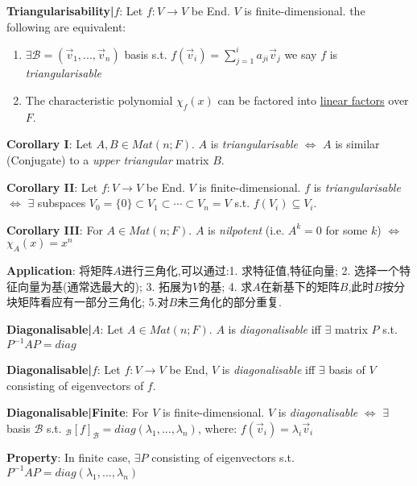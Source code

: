 \documentclass[9pt]{article}
\begin{document}
\textbf{Triangularisability|$f$}: Let $f:V\to V$ be End. $V$ is finite-dimensional. the following are equivalent:
\begin{enumerate}[itemsep=-2pt, topsep=-2pt]
    \item $\exists \mathcal{B}=(\vec{v}_1,...,\vec{v}_n)$ basis s.t. $f(\vec{v}_i)=\sum_{j=1}^ia_{ji}\vec{v}_j$  \qquad we say $f$ is \textit{triangularisable}
    \item The characteristic polynomial $\chi_f(x)$ can be factored into \underline{linear factors} over $F$. 
\end{enumerate}

\quad \textbf{Corollary I}: Let $A,B \in Mat(n;F)$. \quad $A$ is \textit{triangularisable} $\Leftrightarrow$ $A$ is similar (Conjugate) to a \textit{upper triangular} matrix $B$.

\quad \textbf{Corollary II}: {\small Let $f:V\to V$ be End. $V$ is finite-dimensional. \quad $f$ is \textit{triangularisable} $\Leftrightarrow$ $\exists$ subspaces $V_0=\{0\}\subset V_1\subset\cdots\subset V_n=V$ s.t. $f(V_i)\subseteq V_i$.}

\quad \textbf{Corollary III}: For $A\in Mat(n;F)$. $A$ is \textit{nilpotent} (i.e. $A^k=0$ for some $k$) $\Leftrightarrow$ $\chi_A(x)=x^n$

\quad \textbf{Application}: {\tiny 将矩阵$A$进行三角化,可以通过:1. 求特征值,特征向量; 2. 选择一个特征向量为基(通常选最大的); 3. 拓展为$V$的基; 4. 求$A$在新基下的矩阵$B$,此时$B$按分块矩阵看应有一部分三角化; 5.对$B$未三角化的部分重复.}

\textbf{Diagonalisable|$A$}: Let $A\in Mat(n;F)$. $A$ is \textit{diagonalisable} iff $\exists$ matrix $P$ s.t. $P^{-1}AP=diag$

\textbf{Diagonalisable|$f$}: Let $f:V\to V$ be End, $V$ is \textit{diagonalisable} iff $\exists$ basis of $V$ consisting of eigenvectors of $f$.

\quad \textbf{Diagonalisable|Finite}: {\small For $V$ is finite-dimensional. \quad $V$ is \textit{diagonalisable} $\Leftrightarrow$ $\exists$ basis $\mathcal{B}$ s.t. $_{\mathcal{B}}[f]_{\mathcal{B}}=diag(\lambda_1,...,\lambda_n)$, \quad where: $f(\vec{v}_i)=\lambda_i\vec{v}_i$}

\quad \textbf{Property}: In finite case, $\exists P$ consisting of eigenvectors s.t. $P^{-1}AP=diag(\lambda_1,...,\lambda_n)$
\end{document}
